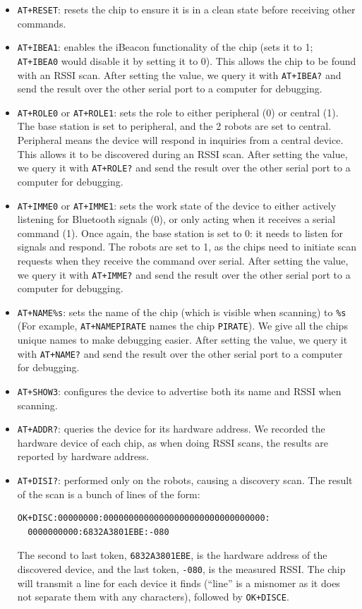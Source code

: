 \documentclass[]{article}
\begin{document}
\begin{itemize}
\item
  \texttt{AT+RESET}: resets the chip to ensure it is in a clean state
  before receiving other commands.
\item
  \texttt{AT+IBEA1}: enables the iBeacon functionality of the chip (sets
  it to 1; \texttt{AT+IBEA0} would disable it by setting it to 0). This
  allows the chip to be found with an RSSI scan. After setting the
  value, we query it with \texttt{AT+IBEA?} and send the result over the
  other serial port to a computer for debugging.
\item
  \texttt{AT+ROLE0} or \texttt{AT+ROLE1}: sets the role to either
  peripheral (0) or central (1). The base station is set to peripheral,
  and the 2 robots are set to central. Peripheral means the device will
  respond in inquiries from a central device. This allows it to be
  discovered during an RSSI scan. After setting the value, we query it
  with \texttt{AT+ROLE?} and send the result over the other serial port
  to a computer for debugging.
\item
  \texttt{AT+IMME0} or \texttt{AT+IMME1}: sets the work state of the
  device to either actively listening for Bluetooth signals (0), or only
  acting when it receives a serial command (1). Once again, the base
  station is set to 0: it needs to listen for signals and respond. The
  robots are set to 1, as the chips need to initiate scan requests when
  they receive the command over serial. After setting the value, we
  query it with \texttt{AT+IMME?} and send the result over the other
  serial port to a computer for debugging.
\item
  \texttt{AT+NAME\%s}: sets the name of the chip (which is visible when
  scanning) to \texttt{\%s} (For example, \texttt{AT+NAMEPIRATE} names
  the chip \texttt{PIRATE}). We give all the chips unique names to make
  debugging easier. After setting the value, we query it with
  \texttt{AT+NAME?} and send the result over the other serial port to a
  computer for debugging.
\item
  \texttt{AT+SHOW3}: configures the device to advertise both its name
  and RSSI when scanning.
\item
  \texttt{AT+ADDR?}: queries the device for its hardware address. We
  recorded the hardware device of each chip, as when doing RSSI scans,
  the results are reported by hardware address.
\item
  \texttt{AT+DISI?}: performed only on the robots, causing a discovery
  scan. The result of the scan is a bunch of lines of the form:

\begin{verbatim}
OK+DISC:00000000:00000000000000000000000000000000:
  0000000000:6832A3801EBE:-080
\end{verbatim}

  The second to last token, \texttt{6832A3801EBE}, is the hardware
  address of the discovered device, and the last token, \texttt{-080},
  is the measured RSSI. The chip will transmit a line for each device it
  finds (``line'' is a misnomer as it does not separate them with any
  characters), followed by \texttt{OK+DISCE}.
\end{itemize}
\end{document}
